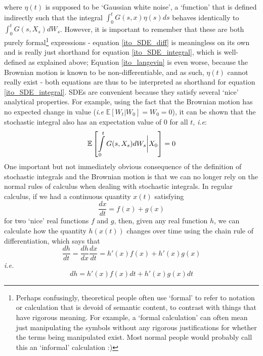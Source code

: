 where $\eta(t)$ is supposed to be `Gaussian white noise', a `function' that is defined indirectly such that the integral $\int_0^{t}G(s,x)\eta(s)ds$ behaves identically to $\int_0^{t}G(s,X_s)dW_s$. However, it is important to remember that these are both purely formal\footnote{Perhaps confusingly, theoretical people often use `formal' to refer to notation or calculation that is devoid of semantic content, to contrast with things that have rigorous meaning. For example, a `formal calculation' can often mean just manipulating the symbols without any rigorous justifications for whether the terms being manipulated exist. Most normal people would probably call this an `informal' calculation :)} expressions - equation \eqref{ito_SDE_diff} is meaningless on its own and is really just shorthand for equation \eqref{ito_SDE_integral}, which is well-defined as explained above; Equation \eqref{ito_langevin} is even worse, because the Brownian motion is known to be non-differentiable, and as such, $\eta(t)$ cannot really exist - both equations are thus to be interpreted as shorthand for equation \eqref{ito_SDE_integral}. SDEs are convenient because they satisfy several `nice' analytical properties. For example, using the fact that the Brownian motion has no expected change in value (\emph{i.e} $\mathbb{E}[W_t | W_0] = W_0 = 0$), it can be shown that the stochastic integral also has an expectation value of $0$ for all $t$, \emph{i.e}:
\begin{equation*}
	\mathbb{E}\left[\int\limits_{0}^{t} G(s,X_s)dW_s \bigg{|} X_0\right] = 0
\end{equation*}
One important but not immediately obvious consequence of the definition of stochastic integrals and the Brownian motion is that we can no longer rely on the normal rules of calculus when dealing with stochastic integrals. In regular calculus, if we had a continuous quantity $x(t)$ satisfying
\begin{equation*}
	\frac{dx}{dt} = f(x) + g(x)
\end{equation*}
for two `nice' real functions $f$ and $g$, then, given any real function $h$, we can calculate how the quantity $h(x(t))$ changes over time using the chain rule of differentiation, which says that
\begin{equation*}
	\frac{dh}{dt} = \frac{dh}{dx}\frac{dx}{dt} = h'(x)f(x) + h'(x)g(x)
\end{equation*}
\emph{i.e.}
\begin{equation*}
	dh =  h'(x)f(x)dt + h'(x)g(x)dt
\end{equation*}
